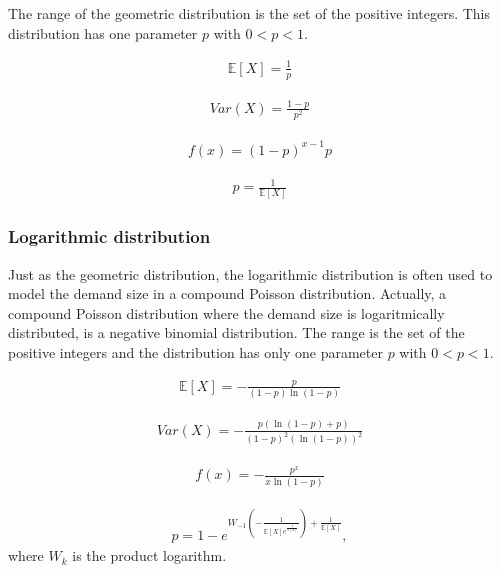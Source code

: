 \documentclass{article}
\begin{document}
\begin{flushleft}
    The range of the geometric distribution is the set of the positive integers.
    This distribution has one parameter $p$ with $0 < p < 1$.
\end{flushleft}

\begin{align*}
    \mathbb{E}[X] = \frac{1}{p}
\end{align*}

\begin{align*}
    Var(X) = \frac{1-p}{p^2}
\end{align*}

\begin{align*}
    f(x) = (1-p)^{x-1}p
\end{align*}

\begin{align*}
    p = \frac{1}{\mathbb{E}[X]}
\end{align*}

\subsubsection{Logarithmic distribution}
Just as the geometric distribution, the logarithmic distribution is often used to model the demand size in a compound Poisson distribution.
Actually, a compound Poisson distribution where the demand size is logaritmically distributed, is a negative binomial distribution.
The range is the set of the positive integers and the distribution has only one parameter $p$ with $0 < p < 1$.

\begin{align*}
    \mathbb{E}[X] = -\frac{p}{(1-p)\ln(1-p)}
\end{align*}

\begin{align*}
    Var(X) = -\frac{p(\ln(1-p)+p)}{(1-p)^2\left(\ln(1-p)\right)^2}
\end{align*}

\begin{align*}
    f(x) = -\frac{p^x}{x\ln(1-p)}
\end{align*}

\begin{align*}
    p = 1-e^{W_{-1}\left(-\frac{1}{\mathbb{E}[X]e^{\frac{1}{\mathbb{E}[X]}}}\right)+\frac{1}{\mathbb{E}[X]}},
\end{align*}
where $W_k$ is the product logarithm.
\end{document}
